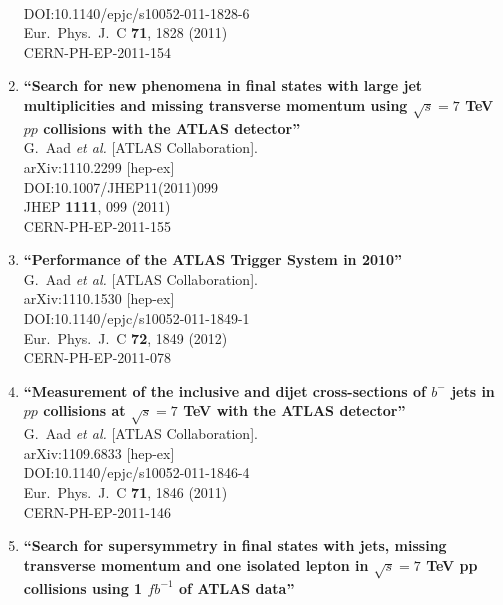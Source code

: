 \documentclass{article}
\begin{document}
\begin{enumerate}
  \\{}DOI:10.1140/epjc/s10052-011-1828-6
  \\{}Eur.\ Phys.\ J.\ C {\bf 71}, 1828 (2011)
  \\{}CERN-PH-EP-2011-154
\item%
{\bf ``Search for new phenomena in final states with large jet multiplicities and missing transverse momentum using $\sqrt{s}=7$ TeV $pp$ collisions with the ATLAS detector''}
  \\{}G.~Aad {\it et al.} [ATLAS Collaboration].
  \\{}arXiv:1110.2299 [hep-ex]
  \\{}DOI:10.1007/JHEP11(2011)099
  \\{}JHEP {\bf 1111}, 099 (2011)
  \\{}CERN-PH-EP-2011-155
\item%
{\bf ``Performance of the ATLAS Trigger System in 2010''}
  \\{}G.~Aad {\it et al.} [ATLAS Collaboration].
  \\{}arXiv:1110.1530 [hep-ex]
  \\{}DOI:10.1140/epjc/s10052-011-1849-1
  \\{}Eur.\ Phys.\ J.\ C {\bf 72}, 1849 (2012)
  \\{}CERN-PH-EP-2011-078
\item%
{\bf ``Measurement of the inclusive and dijet cross-sections of $b^-$ jets in $pp$ collisions at $\sqrt{s}=7$ TeV with the ATLAS detector''}
  \\{}G.~Aad {\it et al.} [ATLAS Collaboration].
  \\{}arXiv:1109.6833 [hep-ex]
  \\{}DOI:10.1140/epjc/s10052-011-1846-4
  \\{}Eur.\ Phys.\ J.\ C {\bf 71}, 1846 (2011)
  \\{}CERN-PH-EP-2011-146
\item%
{\bf ``Search for supersymmetry in final states with jets, missing transverse momentum and one isolated lepton in $\sqrt{s} = 7$ TeV pp collisions using 1 $fb^{-1}$ of ATLAS data''}

\end{enumerate}
\end{document}
